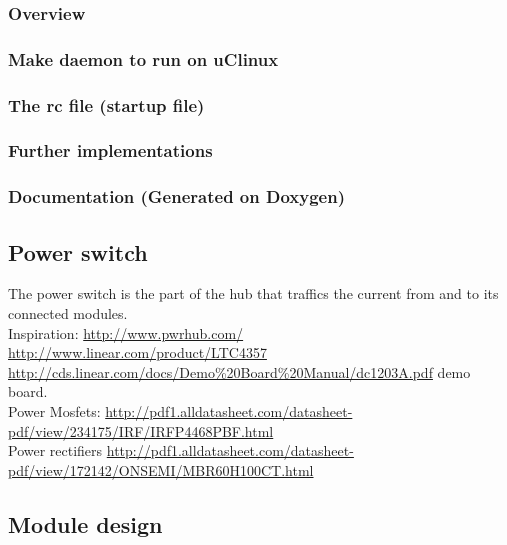 \subsubsection{Overview}
\subsubsection{Make daemon to run on uClinux}
\subsubsection{The rc file (startup file)}
\subsubsection{Further implementations}
\subsubsection{Documentation (Generated on Doxygen)}



\subsection{Power switch}
The power switch is the part of the hub that traffics the current from and to its connected modules. 
\\ Inspiration: 
\url{http://www.pwrhub.com/}
\\ \url{http://www.linear.com/product/LTC4357}
\\ \url{http://cds.linear.com/docs/Demo\%20Board\%20Manual/dc1203A.pdf} demo board.
\\ Power Mosfets:
\url{http://pdf1.alldatasheet.com/datasheet-pdf/view/234175/IRF/IRFP4468PBF.html}
\\ Power rectifiers
\url{http://pdf1.alldatasheet.com/datasheet-pdf/view/172142/ONSEMI/MBR60H100CT.html}


\subsection{Module design}


